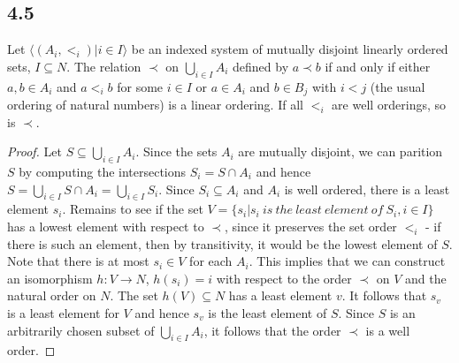 \subsection*{4.5}
Let $\langle (A_i, <_i) | i \in I \rangle$ be an indexed system of mutually disjoint linearly ordered sets, $I \subseteq N$. The relation $\prec$ on $\bigcup_{i \in I} A_i$ defined by $a \prec b$ if and only if either $a,b \in A_i$ and $a <_i b$ for some $i \in I$ or $a \in A_i$ and $b \in B_j$ with $i < j$ (the usual ordering of natural numbers) is a linear ordering. If all $<_i$ are well orderings, so is $\prec$.

\begin{proof}

Let $S \subseteq \bigcup_{i \in I} A_i$. Since the sets $A_i$ are mutually disjoint, we can parition $S$ by computing the intersections $S_i = S \cap A_i$ and hence $S = \bigcup_{i \in I} S \cap A_i = \bigcup_{i \in I} S_i$. Since $S_i \subseteq A_i$ and $A_i$ is well ordered, there is a least element $s_i$. Remains to see if the set $V = \{s_i | s_i~is~the~least~element~of~S_i, i \in I\}$ has a lowest element with respect to $\prec$, since it preserves the set order $<_i$ - if there is such an element, then by transitivity, it would be the lowest element of $S$. Note that there is at most $s_i \in V$ for each $A_i$. This implies that we can construct an isomorphism $h: V \rightarrow N$, $h(s_i) = i$ with respect to the order $\prec$ on $V$ and the natural order on $N$. The set $h(V) \subseteq N$ has a least element $v$. It follows that $s_v$ is a least element for $V$ and hence $s_v$ is the least element of $S$. Since $S$ is an arbitrarily chosen subset of $\bigcup_{i \in I} A_i$, it follows that the order $\prec$ is a well order.

\end{proof}



